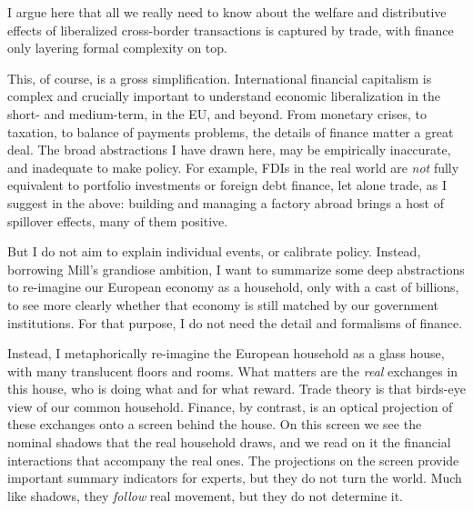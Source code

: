 \documentclass[11pt,a4paper,oneside]{article}
\begin{document}
I argue here that all we really need to know about the welfare and distributive effects of liberalized cross-border transactions is captured by trade, with finance only layering formal complexity on top.

This, of course, is a gross simplification. 
International financial capitalism is complex and crucially important to understand economic liberalization in the short- and medium-term, in the \gls{EU}, and beyond. 
From monetary crises, to taxation, to balance of payments problems, the details of finance matter a great deal. 
The broad abstractions I have drawn here, may be empirically inaccurate, and inadequate to make policy. 
For example, \glspl{FDI} in the real world are \emph{not} fully equivalent to portfolio investments or foreign debt finance, let alone trade, as I suggest in the above: 
building and managing a factory abroad brings a host of spillover effects, many of them positive.

But I do not aim to explain individual events, or calibrate policy. 
Instead, borrowing Mill's grandiose ambition, I want to summarize some deep abstractions to re-imagine our European economy as a household, only with a cast of billions, to see more clearly whether that economy is still matched by our government institutions. 
For that purpose, I do not need the detail and formalisms of finance.

Instead, I metaphorically re-imagine the European household as a glass house, with many translucent floors and rooms. 
What matters are the \emph{real} exchanges in this house, who is doing what and for what reward. 
Trade theory is that birds-eye view of our common household. 
Finance, by contrast, is an optical projection of these exchanges onto a screen behind the house. 
On this screen we see the nominal shadows that the real household draws, and we read on it the financial interactions that accompany the real ones. 
The projections on the screen provide important summary indicators for experts, but they do not turn the world. 
Much like shadows, they \emph{follow} real movement, but they do not determine it.
\end{document}
